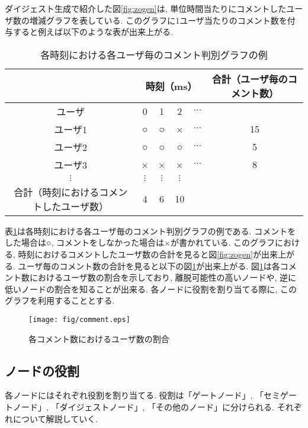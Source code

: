 ダイジェスト生成で紹介した図\ref{fig:zogen}は, 単位時間当たりにコメントしたユーザ数の増減グラフを表している. このグラフに1ユーザ当たりのコメント数を付与すると例えば以下のような表が出来上がる.

\begin{table}[h]
  \caption{各時刻における各ユーザ毎のコメント判別グラフの例}
  \label{tbl:user-comment}
  \centering
      {\small
        \begin{tabular}{|c||c|c|c|c|c|} \hline
          & \multicolumn{4}{|c|}{時刻（ms）} & 合計（ユーザ毎のコメント数） \\ \hline \hline
          ユーザ & 0 & 1 & 2 & $\cdots$ & \\ \hline \hline
          ユーザ1 & ○ & ○ & × & $\cdots$ & 15 \\ \hline
          ユーザ2 & ○ & ○ & ○ & $\cdots$ & 5 \\ \hline
          ユーザ3 & × & × & × & $\cdots$ & 8 \\ \hline
          $\vdots$ & $\vdots$ & $\vdots$ & $\vdots$ & &  \\ \hline
          合計（時刻におけるコメントしたユーザ数） & 4 & 6 & 10 & &  \\ \hline
        \end{tabular}
      }
\end{table}

表\ref{tbl:user-comment}は各時刻における各ユーザ毎のコメント判別グラフの例である. コメントをした場合は○, コメントをしなかった場合は×が書かれている. このグラフにおける, 時刻におけるコメントしたユーザ数の合計を見ると図\ref{fig:zogen}が出来上がる. ユーザ毎のコメント数の合計を見ると以下の図\ref{fig:comment}が出来上がる. 図\ref{fig:comment}は各コメント数におけるユーザ数の割合を示しており, 離脱可能性の高いノードや, 逆に低いノードの割合を知ることが出来る. 各ノードに役割を割り当てる際に, このグラフを利用することとする.

\begin{figure}[h]
  \centering
  \texttt{[image: fig/comment.eps]}
  \caption{各コメント数におけるユーザ数の割合}
  \label{fig:comment}
\end{figure}

\newpage

\subsection{ノードの役割}
各ノードにはそれぞれ役割を割り当てる. 役割は「ゲートノード」, 「セミゲートノード」, 「ダイジェストノード」, 「その他のノード」に分けられる. それぞれについて解説していく.


